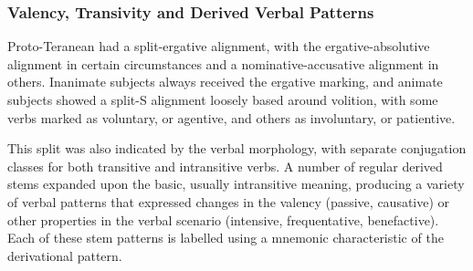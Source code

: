 \documentclass[grammar]{subfiles}
\begin{document}
\subsubsection{Valency, Transivity and Derived Verbal Patterns}
\label{sssec:history:pt:vm:valency_transivity_verbal_patterns}

Proto-Teranean had a split-ergative alignment, with the ergative-absolutive
alignment in certain circumstances and a nominative-accusative alignment in
others.  Inanimate subjects always received the ergative marking, and animate
subjects showed a split-S alignment loosely based around volition, with some
verbs marked as voluntary, or agentive, and others as involuntary, or
patientive.  

This split was also indicated by the verbal morphology, with separate
conjugation classes for both transitive and intransitive verbs.  A number of
regular derived stems expanded upon the basic, usually intransitive meaning,
producing a variety of verbal patterns that expressed changes in the valency
(passive, causative) or other properties in the verbal scenario (intensive,
frequentative, benefactive).  Each of these stem patterns is labelled using a
mnemonic characteristic of the derivational pattern.
\end{document}
